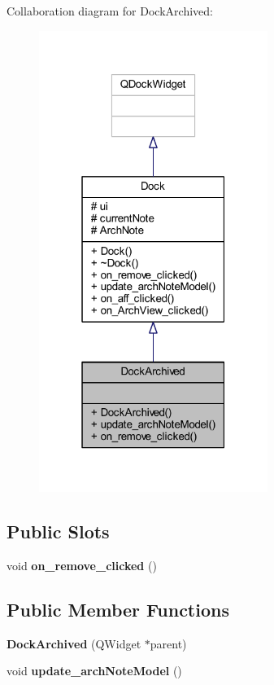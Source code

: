 Collaboration diagram for Dock\+Archived\+:
\nopagebreak
\begin{figure}[H]
\begin{center}
\leavevmode
\includegraphics[width=211pt]{class_dock_archived__coll__graph}
\end{center}
\end{figure}
\subsection*{Public Slots}
\begin{DoxyCompactItemize}
\item 
\mbox{\label{class_dock_archived_ab2ec83022057fff8169784cf02876a8a}} 
void {\bfseries on\+\_\+remove\+\_\+clicked} ()
\end{DoxyCompactItemize}
\subsection*{Public Member Functions}
\begin{DoxyCompactItemize}
\item 
\mbox{\label{class_dock_archived_ad3cc1b3cbaa84fed8d37c478927c7463}} 
{\bfseries Dock\+Archived} (Q\+Widget $\ast$parent)
\item 
\mbox{\label{class_dock_archived_a557ea9fc3b685f0aefbae0bcd624cbec}} 
void {\bfseries update\+\_\+arch\+Note\+Model} ()
\end{DoxyCompactItemize}
